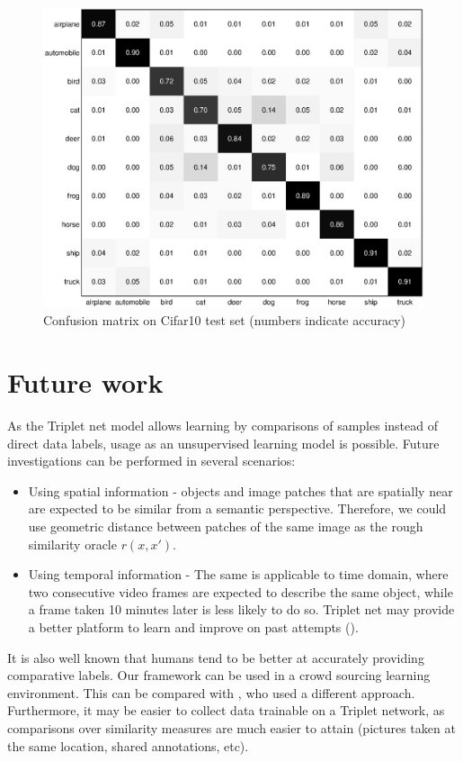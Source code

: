 \documentclass{article} %
\begin{document}
\begin{figure}[h]
\begin{center}
\includegraphics[width=0.8\linewidth]{confusion.eps}
\end{center}
   \caption{Confusion matrix on Cifar10 test set (numbers indicate accuracy)}\label{confusion}
\end{figure}
\section{Future work}
As the Triplet net model allows learning by comparisons of samples instead of direct data labels, usage as an unsupervised learning model is possible.
Future investigations can be performed in several scenarios:
\begin{itemize}
 \item Using spatial information - objects and image patches that are spatially near are expected to be similar from a semantic perspective. Therefore, we could use geometric distance between patches of the same image as the rough similarity oracle $r(x,x')$.
\item Using temporal information - The same is applicable to time domain, where two consecutive video frames are expected to describe the same object, while a frame taken 10 minutes later is less likely to do so.
Triplet net may provide a better platform to learn and improve on past attempts (\citet{mobahi2009deep}).
\end{itemize}
It is also well known that humans tend to be better at accurately providing comparative labels. Our framework can be used in a crowd sourcing learning environment. This can be compared with \citet{shamir}, who used a different approach.
Furthermore, it may be easier to collect data trainable on a Triplet network, as comparisons over similarity measures are much easier to attain (pictures taken at the same location, shared annotations, etc).
\end{document}
